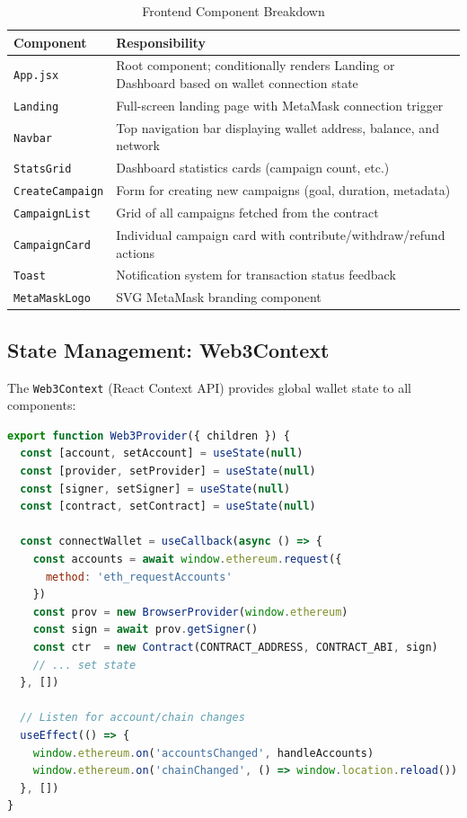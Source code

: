 \begin{table}[H]
\centering
\caption{Frontend Component Breakdown}
\label{tab:components}
\begin{tabularx}{\textwidth}{l X}
\toprule
\textbf{Component} & \textbf{Responsibility} \\
\midrule
\texttt{App.jsx}          & Root component; conditionally renders Landing or Dashboard based on wallet connection state \\
\texttt{Landing}           & Full-screen landing page with MetaMask connection trigger \\
\texttt{Navbar}            & Top navigation bar displaying wallet address, balance, and network \\
\texttt{StatsGrid}         & Dashboard statistics cards (campaign count, etc.) \\
\texttt{CreateCampaign}    & Form for creating new campaigns (goal, duration, metadata) \\
\texttt{CampaignList}      & Grid of all campaigns fetched from the contract \\
\texttt{CampaignCard}      & Individual campaign card with contribute/withdraw/refund actions \\
\texttt{Toast}             & Notification system for transaction status feedback \\
\texttt{MetaMaskLogo}      & SVG MetaMask branding component \\
\bottomrule
\end{tabularx}
\end{table}

\subsection{State Management: Web3Context}

The \texttt{Web3Context} (React Context API) provides global wallet state to all components:

\begin{lstlisting}[language=JavaScript, caption={Web3 Context Provider (Simplified)}]
export function Web3Provider({ children }) {
  const [account, setAccount] = useState(null)
  const [provider, setProvider] = useState(null)
  const [signer, setSigner] = useState(null)
  const [contract, setContract] = useState(null)

  const connectWallet = useCallback(async () => {
    const accounts = await window.ethereum.request({
      method: 'eth_requestAccounts'
    })
    const prov = new BrowserProvider(window.ethereum)
    const sign = await prov.getSigner()
    const ctr  = new Contract(CONTRACT_ADDRESS, CONTRACT_ABI, sign)
    // ... set state
  }, [])

  // Listen for account/chain changes
  useEffect(() => {
    window.ethereum.on('accountsChanged', handleAccounts)
    window.ethereum.on('chainChanged', () => window.location.reload())
  }, [])
}
\end{lstlisting}

